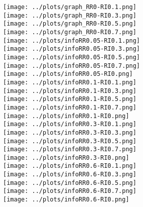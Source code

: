 \documentclass[a4paper, 11pt]{report}
\begin{document}
\texttt{[image: ../plots/graph\_RR0-RI0.1.png]}\\
\texttt{[image: ../plots/graph\_RR0-RI0.3.png]}\\
\texttt{[image: ../plots/graph\_RR0-RI0.5.png]}\\
\texttt{[image: ../plots/graph\_RR0-RI0.7.png]}\\
\texttt{[image: ../plots/infoRR0.05-RI0.1.png]}\\
\texttt{[image: ../plots/infoRR0.05-RI0.3.png]}\\
\texttt{[image: ../plots/infoRR0.05-RI0.5.png]}\\
\texttt{[image: ../plots/infoRR0.05-RI0.7.png]}\\
\texttt{[image: ../plots/infoRR0.05-RI0.png]}\\
\texttt{[image: ../plots/infoRR0.1-RI0.1.png]}\\
\texttt{[image: ../plots/infoRR0.1-RI0.3.png]}\\
\texttt{[image: ../plots/infoRR0.1-RI0.5.png]}\\
\texttt{[image: ../plots/infoRR0.1-RI0.7.png]}\\
\texttt{[image: ../plots/infoRR0.1-RI0.png]}\\
\texttt{[image: ../plots/infoRR0.3-RI0.1.png]}\\
\texttt{[image: ../plots/infoRR0.3-RI0.3.png]}\\
\texttt{[image: ../plots/infoRR0.3-RI0.5.png]}\\
\texttt{[image: ../plots/infoRR0.3-RI0.7.png]}\\
\texttt{[image: ../plots/infoRR0.3-RI0.png]}\\
\texttt{[image: ../plots/infoRR0.6-RI0.1.png]}\\
\texttt{[image: ../plots/infoRR0.6-RI0.3.png]}\\
\texttt{[image: ../plots/infoRR0.6-RI0.5.png]}\\
\texttt{[image: ../plots/infoRR0.6-RI0.7.png]}\\
\texttt{[image: ../plots/infoRR0.6-RI0.png]}\\
\end{document}
